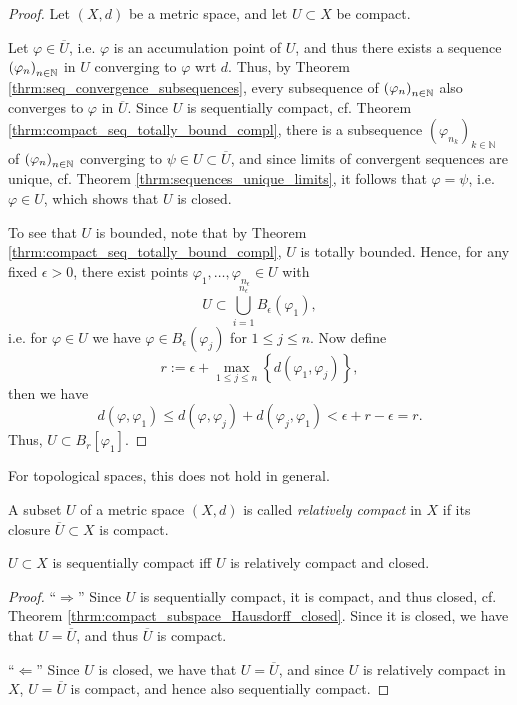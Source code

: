 \begin{proof}
	Let $(X, d)$ be a metric space, and let $U\subset X$ be compact. 
	
	Let $\varphi\in \overline{U}$, i.e. $\varphi$ is an accumulation point of $U$, and thus there exists a sequence $\seq[\varphi_n]$ in $U$ converging to $\varphi$ wrt $d$. Thus, by Theorem \ref{thrm:seq_convergence_subsequences}, every subsequence of $\seq[\varphi_n]$ also converges to $\varphi$ in $\overline{U}$. Since $U$ is sequentially compact, cf. Theorem \ref{thrm:compact_seq_totally_bound_compl}, there is a subsequence $\left(\varphi_{n_k}\right)_{k\in\mathbb N}$ of $\seq[\varphi_n]$ converging to $\psi\in U\subset \overline{U}$, and since limits of convergent sequences are unique, cf. Theorem \ref{thrm:sequences_unique_limits}, it follows that $\varphi=\psi$, i.e. $\varphi\in U$, which shows that $U$ is closed.
	
	To see that $U$ is bounded, note that by Theorem \ref{thrm:compact_seq_totally_bound_compl}, $U$ is totally bounded. Hence, for any fixed $\epsilon > 0$, there exist points $\varphi_1, \dots, \varphi_{n_{\epsilon}}\in U$ with $$U\subset \bigcup_{i = 1}^{n_{\epsilon}}B_{\epsilon}(\varphi_1),$$ i.e. for $\varphi\in U$ we have $\varphi\in B_{\epsilon}(\varphi_j)$ for $1\leq j\leq n$. Now define
	$$r := \epsilon + \max_{1\leq j\leq n}\left\{ d(\varphi_1, \varphi_j)\right\},$$
	then we have
	$$d(\varphi, \varphi_1) \leq d(\varphi, \varphi_j) + d(\varphi_j, \varphi_1) < \epsilon + r - \epsilon = r.$$
	Thus, $U\subset B_{r}[\varphi_1]$.
\end{proof}

\begin{remark}
	For topological spaces, this does not hold in general.
\end{remark}

\begin{defn}
	A subset $U$ of a metric space $(X, d)$ is called \textit{relatively compact} in $X$ if its closure $\overline{U}\subset X$ is compact.
\end{defn}

\begin{theorem}\label{thrm:seq_compact_equiv_rel_compact_closed}
	$U\subset X$ is sequentially compact iff $U$ is relatively compact and closed.
\end{theorem}

\begin{proof}
	\enquote{$\Longrightarrow$} Since $U$ is sequentially compact, it is compact, and thus closed, cf. Theorem \ref{thrm:compact_subspace_Hausdorff_closed}. Since it is closed, we have that $U = \overline{U}$, and thus $\overline{U}$ is compact.
	
	\enquote{$\Longleftarrow$} Since $U$ is closed, we have that $U = \overline{U}$, and since $U$ is relatively compact in $X$, $U = \overline{U}$ is compact, and hence also sequentially compact.
\end{proof}

